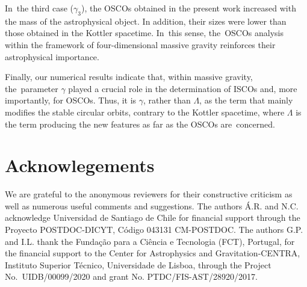 \documentclass[aps,amsmath,amssymb,twocolumn]{revtex4}
\begin{document}
In~the third case ($\gamma_3$), the OSCOs obtained in the present work increased with the mass of the astrophysical object. In addition, their sizes were lower than those obtained in the Kottler spacetime. In~this sense, the~OSCOs analysis within the framework of four-dimensional massive gravity reinforces their astrophysical importance. 


Finally, our numerical results indicate that, within massive gravity, the~parameter $\gamma$ played a crucial role in the determination of ISCOs and, more importantly, for OSCOs. Thus, it is $\gamma$, rather than $\Lambda$, as the term that mainly modifies the stable circular orbits, contrary to the Kottler spacetime, where $\Lambda$ is the term producing the new features as far as the OSCOs are~concerned.



\section*{Acknowlegements}


We are grateful to the anonymous reviewers for their constructive criticism as well as numerous useful comments and suggestions.
The authors \'A.R. and N.C. acknowledge Universidad de Santiago de Chile for financial support through the 
%
Proyecto POSTDOC-DICYT, C\'odigo 043131 CM-POSTDOC.
%
The authors G.P. and I.L. thank the Funda\c c\~ao para a Ci\^encia e Tecnologia (FCT), Portugal, 
for the financial support to the Center for Astrophysics and Gravitation-CENTRA, Instituto Superior T\'ecnico, 
Universidade de Lisboa, through the Project No.~UIDB/00099/2020 and grant No. PTDC/FIS-AST/28920/2017.


\end{document}
